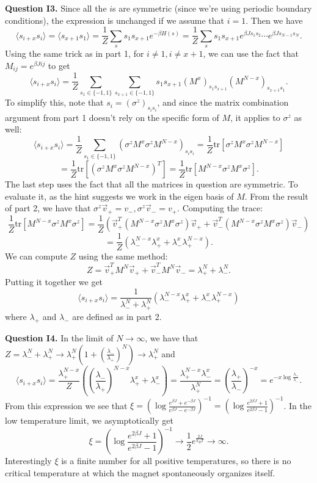 \documentclass[letterpaper, reqno,11pt]{article}
\begin{document}
{\medskip\noindent\bf Question I3.} Since all the $i$s are symmetric (since we're using periodic boundary conditions), the expression is unchanged if we assume that $i=1$. Then we have
\[
    \langle s_{i+x}s_i \rangle =\langle s_{x+1}s_1 \rangle =\frac{1}{Z}\sum_{s} s_1 s_{x+1}e^{-\beta H(s)}=\frac{1}{Z}\sum_{s} s_1 s_{x+1}e^{\beta Js_1s_2}\cdots e^{\beta Js_{N-1}s_N}
.\]
Using the same trick as in part 1, for $i\neq 1, i\neq x+1$, we can use the fact that $M_{ij}=e^{\beta J ij}$ to get
\[
    \langle s_{i+x}s_i \rangle= \frac{1}{Z}\sum_{s_1\in \{-1,1\}}\sum_{s_{x+1}\in \{-1,1\}}s_1s_{x+1}(M^{x})_{s_1s_{x+1}}(M^{N-x})_{s_{x+1}s_1}
.\]
To simplify this, note that $s_i=\left( \sigma^{z} \right)_{s_is_i}$, and since the matrix combination argument from part 1 doesn't rely on the specific form of $M$, it applies to $\sigma^{z}$ as well:
\[
    \langle s_{i+x}s_i \rangle= \frac{1}{Z}\sum_{s_1\in \{-1,1\}}\left( \sigma^{z}M^{x}\sigma^{z}M^{N-x} \right)_{s_is_i}=\frac{1}{Z}\text{tr}\left[ \sigma^{z}M^{x}\sigma^{z}M^{N-x} \right]
\]
\[
=\frac{1}{Z}\text{tr}\left[ \left(\sigma^{z}M^{x}\sigma^{z}M^{N-x}\right)^{T} \right]=\frac{1}{Z}\text{tr}\left[ M^{N-x}\sigma^{z}M^{x}\sigma^{z} \right]
.\]
The last step uses the fact that all the matrices in question are symmetric. To evaluate it, as the hint suggests we work in the eigen basis of $M$. From the result of part 2, we have that $\sigma^{z}\vec v_+=v_-, \sigma^{z}\vec v_-=v_+$. Computing the trace:
\[
\frac{1}{Z}\text{tr}\left[ M^{N-x}\sigma^{z}M^{x}\sigma^{z} \right]=\frac{1}{Z}\left( \vec v_+^{T}(M^{N-x}\sigma^{z}M^{x}\sigma^{z})\vec v_++\vec v_-^{T}(M^{N-x}\sigma^{z}M^{x}\sigma^{z})\vec v_- \right)
\]
\[
 =\frac{1}{Z}\left( \lambda_-^{N-x}\lambda_+^{x}+\lambda_-^{x}\lambda_+^{N-x} \right)
.\]
We can compute $Z$ using the same method:
\[
Z=\vec v_+^{T}M^{N}\vec v_+ + \vec v_-^{T}M^{N}\vec v_- = \lambda_+^{N}+\lambda_-^{N}
.\]
Putting it together we get
\[
\langle s_{i+x}s_i \rangle = \frac{1}{\lambda_-^{N}+\lambda_+^{N}} \left( \lambda_-^{N-x}\lambda_+^{x}+\lambda_-^{x}\lambda_+^{N-x} \right)
\]
where $\lambda_+$ and $\lambda_-$ are defined as in part 2.

{\medskip\noindent\bf Question I4.} In the limit of $N\to\infty$, we have that $Z=\lambda_-^{N}+\lambda_+^{N}\to \lambda_+^{N}\left( 1+\left(\frac{\lambda_-}{\lambda_+}\right)^{N} \right) \to\lambda_+^{N}$ and
\[
\langle s_{i+x}s_i \rangle = \frac{\lambda_+^{N-x}}{Z}\left( \left(\frac{\lambda_-}{\lambda_+}\right)^{N-x}\lambda_+^{x}+\lambda_-^{x} \right) =\frac{\lambda_+^{N-x}\lambda_-^{x}}{\lambda_+^{N}}=\left( \frac{\lambda_+}{\lambda_-} \right) ^{-x}=e^{-x\log \frac{\lambda_+}{\lambda_-}}
.\]
From this expression we see that $\xi=\left(\log \frac{e^{\beta J}+e^{-\beta J}}{e^{\beta J}-e^{-\beta J}}\right)^{-1}=\left(\log \frac{e^{2\beta J}+1}{e^{2\beta J}-1}\right)^{-1}$. In the low temperature limit, we asymptotically get
\[
\xi = \left(\log \frac{e^{2\beta J}+1}{e^{2\beta J}-1}\right)^{-1}\to \frac{1}{2}e^{\frac{2J}{k_BT}}\to\infty
.\]
Interestingly $\xi$ is a finite number for all positive temperatures, so there is no critical temperature at which the magnet spontaneously organizes itself.
\end{document}
